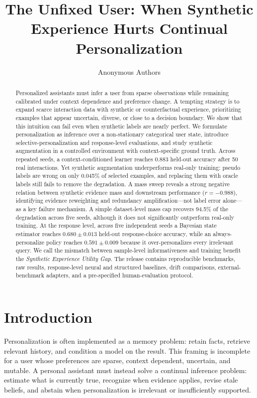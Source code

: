 \documentclass[10pt,twocolumn]{article}
\title{\textbf{The Unfixed User: When Synthetic Experience Hurts Continual Personalization}}
\author{Anonymous Authors}
\date{}
\begin{document}
\maketitle
\begin{abstract}
Personalized assistants must infer a user from sparse observations while remaining calibrated under context dependence and preference change. A tempting strategy is to expand scarce interaction data with synthetic or counterfactual experience, prioritizing examples that appear uncertain, diverse, or close to a decision boundary. We show that this intuition can fail even when synthetic labels are nearly perfect. We formulate personalization as inference over a non-stationary categorical user state, introduce selective-personalization and response-level evaluations, and study synthetic augmentation in a controlled environment with context-specific ground truth. Across repeated seeds, a context-conditioned learner reaches 0.883 held-out accuracy after 50 real interactions. Yet synthetic augmentation underperforms real-only training: pseudo labels are wrong on only 0.045\% of selected examples, and replacing them with oracle labels still fails to remove the degradation. A mass sweep reveals a strong negative relation between synthetic evidence mass and downstream performance ($r=-0.988$), identifying evidence reweighting and redundancy amplification---not label error alone---as a key failure mechanism. A simple dataset-level mass cap recovers 94.5\% of the degradation across five seeds, although it does not significantly outperform real-only training. At the response level, across five independent seeds a Bayesian state estimator reaches $0.680\pm0.013$ held-out response-choice accuracy, while an always-personalize policy reaches $0.591\pm0.009$ because it over-personalizes every irrelevant query. We call the mismatch between sample-level informativeness and training benefit the \emph{Synthetic Experience Utility Gap}. The release contains reproducible benchmarks, raw results, response-level neural and structured baselines, drift comparisons, external-benchmark adapters, and a pre-specified human-evaluation protocol.
\end{abstract}

\section{Introduction}
Personalization is often implemented as a memory problem: retain facts, retrieve relevant history, and condition a model on the result. This framing is incomplete for a user whose preferences are sparse, context dependent, uncertain, and mutable. A personal assistant must instead solve a continual inference problem: estimate what is currently true, recognize when evidence applies, revise stale beliefs, and abstain when personalization is irrelevant or insufficiently supported.
\end{document}
